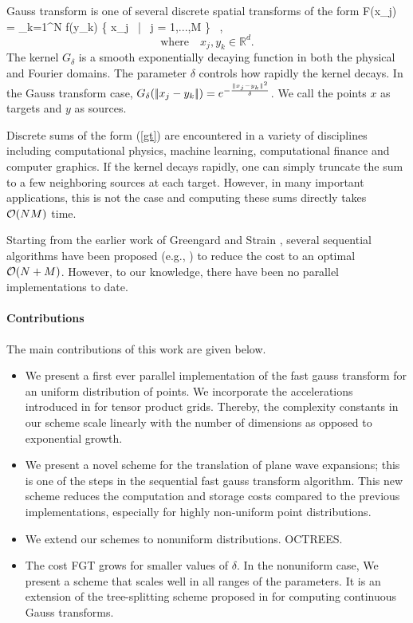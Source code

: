 Gauss transform is one of several discrete spatial transforms of the form 
%
\beq F(x_j) = \sum_{k=1}^N  f(y_k) \quad {} \quad \{ x_j \, | \, j = 1,...,M \} \, , \label{gt} \eeq
\[\text{where} \quad x_j, y_k \in \mathbb{R}^d. \]
%
The kernel $G_\delta$ is a smooth exponentially decaying function in both the physical
and Fourier domains. The parameter $\delta$ controls how rapidly the kernel decays.  
In the Gauss transform case, $G_\delta (|\!| x_j - y_k |\!|) = e^{-\frac{\|x_j - y_k\|^2}{\delta}}$.  We call the
points $x$ as targets and $y$ as sources.  

Discrete sums of the form (\ref{gt}) are encountered in a variety of disciplines including computational physics, machine learning, computational finance and computer graphics. If the kernel decays rapidly, one can simply truncate the sum to a few neighboring sources at each target. However, in many important applications, this is not the case and computing these sums directly takes $\mathcal{O}(NM)$ time. 

Starting from the earlier work of Greengard and Strain \cite{fgt}, several sequential algorithms have 
been proposed (e.g.,  \cite{greengard98, duraiswami03, tausch09, fggt}) to reduce the 
cost to an optimal $\mathcal{O}(N+M)$. However, to our knowledge, there have been no parallel implementations to date. 

\paragraph{Contributions} The main contributions of this work are given below.
\begin{itemize} 
%
\item We present a first ever parallel implementation of the fast gauss transform for an 
uniform distribution of points. We incorporate the accelerations introduced in \cite{fggt} for tensor product grids. 
Thereby, the complexity constants in our scheme scale linearly with the number of dimensions 
as opposed to exponential growth. 
%
\item We present a novel scheme for the translation of plane wave expansions; this is one
of the steps in the sequential fast gauss transform algorithm. This new scheme reduces the 
computation and storage costs compared to the previous implementations, especially for highly
non-uniform point distributions.
%
\item We extend our schemes to nonuniform distributions. OCTREES.

\item The cost FGT grows for smaller values of $\delta$. In the nonuniform case, 
We present a scheme that scales well in all ranges of the parameters. It is an extension of the tree-splitting scheme proposed in \cite{veerapaneni08} for computing continuous Gauss transforms. 
%
\end{itemize}

